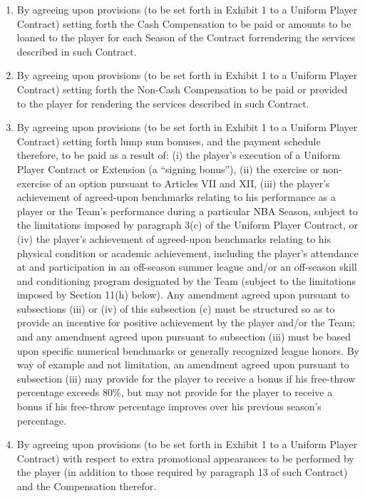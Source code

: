 \documentclass[
]{book}
\providecommand{\tightlist}{%
  \setlength{\itemsep}{0pt}\setlength{\parskip}{0pt}}
\begin{document}
\begin{enumerate}
\def\labelenumi{(\alph{enumi})}
\tightlist
\item
  By agreeing upon provisions (to be set forth in Exhibit 1 to a Uniform Player Contract) setting forth the Cash Compensation to be paid or amounts to be loaned to the player for each Season of the Contract forrendering the services described in such Contract.
\item
  By agreeing upon provisions (to be set forth in Exhibit 1 to a Uniform Player Contract) setting forth the Non-Cash Compensation to be paid or provided to the player for rendering the services described in such Contract.
\item
  By agreeing upon provisions (to be set forth in Exhibit 1 to a Uniform Player Contract) setting forth lump sum bonuses, and the payment schedule therefore, to be paid as a result of: (i) the player's execution of a Uniform Player Contract or Extension (a ``signing bonus''), (ii) the exercise or non-exercise of an option pursuant to Articles VII and XII, (iii) the player's achievement of agreed-upon benchmarks relating to his performance as a player or the Team's performance during a particular NBA Season, subject to the limitations imposed by paragraph 3(c) of the Uniform Player Contract, or (iv) the player's achievement of agreed-upon benchmarks relating to his physical condition or academic achievement, including the player's attendance at and participation in an off-season summer league and/or an off-season skill and conditioning program designated by the Team (subject to the limitations imposed by Section 11(h) below). Any amendment agreed upon pursuant to subsections (iii) or (iv) of this subsection (c) must be structured so as to provide an incentive for positive achievement by the player and/or the Team; and any amendment agreed upon pursuant to subsection (iii) must be based upon specific numerical benchmarks or generally recognized league honors. By way of example and not limitation, an amendment agreed upon pursuant to subsection (iii) may provide for the player to receive a bonus if his free-throw percentage exceeds 80\%, but may not provide for the player to receive a bonus if his free-throw percentage improves over his previous season's percentage.
\item
  By agreeing upon provisions (to be set forth in Exhibit 1 to a Uniform Player Contract) with respect to extra promotional appearances to be performed by the player (in addition to those required by paragraph 13 of such Contract) and the Compensation therefor.

\end{enumerate}
\end{document}
